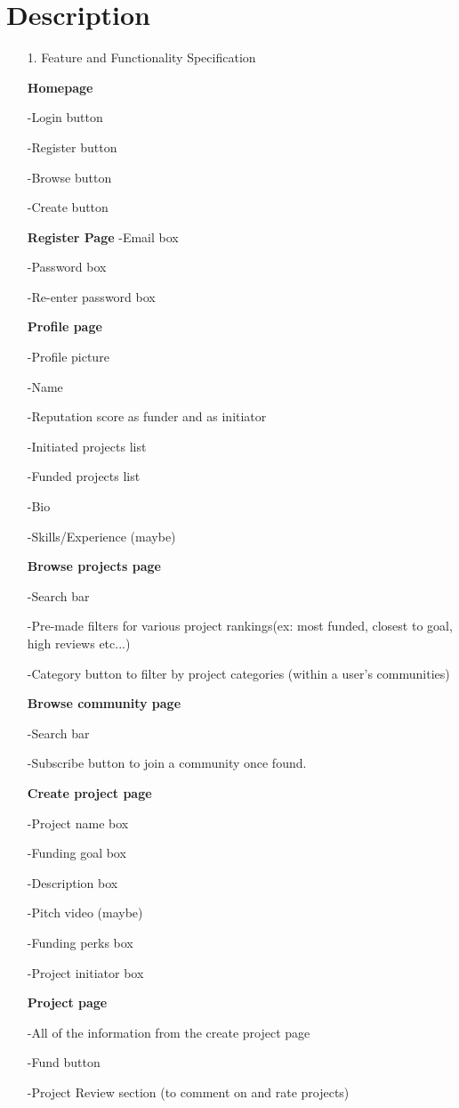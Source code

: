 \documentclass[12pt]{article}
\begin{document}
\section*{Description}
\begin{enumerate}
\item[1.] Feature and Functionality Specification

\textbf{Homepage}

-Login button

-Register button

-Browse button

-Create button

\textbf{Register Page}
-Email box

-Password box

-Re-enter password box

\textbf{Profile page}

-Profile picture

-Name

-Reputation score as funder and as initiator

-Initiated projects list

-Funded projects list

-Bio

-Skills/Experience (maybe)

\textbf{Browse projects page}

-Search bar

-Pre-made filters for various project rankings(ex: most funded, closest to goal, high reviews etc...)

-Category button to filter by project categories (within a user's communities)

\textbf{Browse community page}

-Search bar

-Subscribe button to join a community once found.

\textbf{Create project page}

-Project name box

-Funding goal box

-Description box

-Pitch video (maybe)

-Funding perks box

-Project initiator  box

\textbf{Project page}

-All of the information from the create project page

-Fund button

-Project Review section (to comment on and rate projects)


\end{enumerate}
\end{document}
